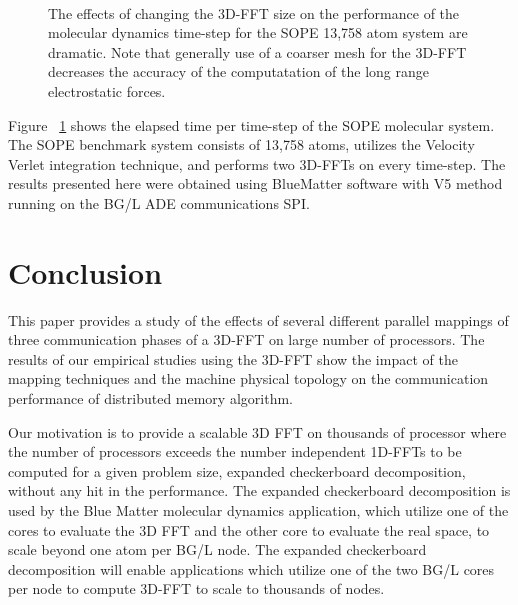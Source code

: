 \begin{figure}
 \\
  \caption{The effects of changing the 3D-FFT size on the performance
    of the molecular dynamics time-step for the SOPE 13,758 atom system
    are dramatic. Note that generally use of a coarser mesh for
    the 3D-FFT decreases the accuracy of the computatation of the long
    range electrostatic forces.}
  \label{fig:sope_benchmark}
\end{figure}


Figure ~\ref{fig:sope_benchmark} shows the elapsed time per time-step
of the SOPE molecular system. The SOPE\cite{pitman_jcp:2005} benchmark
system consists of 13,758 atoms, utilizes the Velocity Verlet
integration technique\cite{Swope1982}, and performs two 3D-FFTs
on every time-step. The results presented here were obtained using
BlueMatter software with V5 method running on the BG/L ADE
communications SPI\cite{Fitch2006}.  

  

\section{Conclusion}
\label{sec:conclusion}
This paper provides a study of the effects of several different
parallel mappings of three communication phases 
of a 3D-FFT on large number of processors. The results of our
empirical studies using the 3D-FFT show the impact of the mapping
techniques and the machine physical topology on the communication
performance of distributed memory algorithm.

Our motivation is to provide a  scalable 3D FFT on thousands of processor where the number of processors
exceeds the number independent 1D-FFTs to be computed for a given problem size, expanded checkerboard decomposition, without
any hit in the performance.   The expanded checkerboard decomposition  is used by the  Blue Matter molecular dynamics
application, which utilize one of the cores to evaluate the 3D FFT
and the other core to evaluate the real space, to scale beyond one atom per
BG/L node. The expanded checkerboard decomposition will enable applications which
utilize one of the two BG/L cores per node to compute 3D-FFT to scale
to thousands of nodes.


